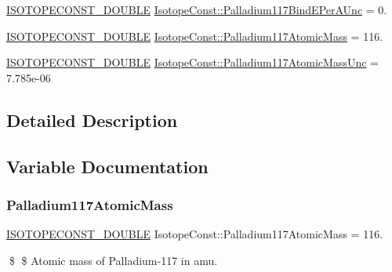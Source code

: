 \begin{DoxyCompactItemize}
\mbox{\hyperlink{group___isotope_const-_macros_ga8f45a7272ce02c0b4c65c44636ed719a}{I\+S\+O\+T\+O\+P\+E\+C\+O\+N\+S\+T\+\_\+\+D\+O\+U\+B\+LE}} \mbox{\hyperlink{group___isotope_const-_palladium-_pd117_ga234579acdfd9fce37cd0bb9c1d3ad86b}{Isotope\+Const\+::\+Palladium117\+Bind\+E\+Per\+A\+Unc}} = 0.
\item 
\mbox{\hyperlink{group___isotope_const-_macros_ga8f45a7272ce02c0b4c65c44636ed719a}{I\+S\+O\+T\+O\+P\+E\+C\+O\+N\+S\+T\+\_\+\+D\+O\+U\+B\+LE}} \mbox{\hyperlink{group___isotope_const-_palladium-_pd117_ga0a2ea3a2a26dae9031e6af3e97777544}{Isotope\+Const\+::\+Palladium117\+Atomic\+Mass}} = 116.
\item 
\mbox{\hyperlink{group___isotope_const-_macros_ga8f45a7272ce02c0b4c65c44636ed719a}{I\+S\+O\+T\+O\+P\+E\+C\+O\+N\+S\+T\+\_\+\+D\+O\+U\+B\+LE}} \mbox{\hyperlink{group___isotope_const-_palladium-_pd117_ga6c04b37784f54ef9d90630ae77400bcd}{Isotope\+Const\+::\+Palladium117\+Atomic\+Mass\+Unc}} = 7.\+785e-\/06
\end{DoxyCompactItemize}


\subsection{Detailed Description}


\subsection{Variable Documentation}
\mbox{\label{group___isotope_const-_palladium-_pd117_ga0a2ea3a2a26dae9031e6af3e97777544}} 
\subsubsection{\texorpdfstring{Palladium117\+Atomic\+Mass}{Palladium117AtomicMass}}
{\footnotesize\ttfamily \mbox{\hyperlink{group___isotope_const-_macros_ga8f45a7272ce02c0b4c65c44636ed719a}{I\+S\+O\+T\+O\+P\+E\+C\+O\+N\+S\+T\+\_\+\+D\+O\+U\+B\+LE}} Isotope\+Const\+::\+Palladium117\+Atomic\+Mass = 116.}

\$ \$ Atomic mass of Palladium-\/117 in amu. \mbox{\label{group___isotope_const-_palladium-_pd117_ga6c04b37784f54ef9d90630ae77400bcd}} 
